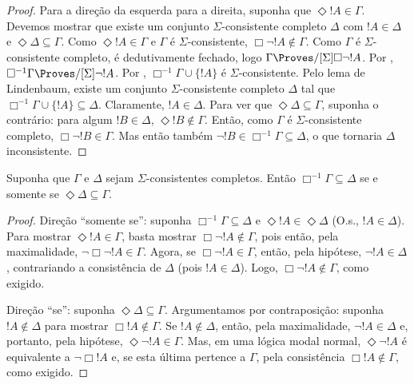 \documentclass[../../../include/open-logic-section]{subfiles}
\begin{document}
{\begin{proof}
  Para a direção da esquerda para a direita, suponha que
  $\Diamond !A \in \Gamma$. Devemos mostrar que existe um conjunto
  $\Sigma$-consistente completo $\Delta$ com $!A \in \Delta$ e
  $\Diamond\Delta \subseteq \Gamma$. Como $\Diamond !A \in \Gamma$ e
  $\Gamma$ é $\Sigma$-consistente, $\Box\lnot !A \notin \Gamma$. Como
  $\Gamma$ é $\Sigma$-consistente completo, é dedutivamente fechado,
  logo $\Gamma \Proves/[\Sigma] \Box\lnot !A$. Por ,
  $\Box^{-1}\Gamma \Proves/[\Sigma] \lnot !A$. Por
  ,
  $\Box^{-1}\Gamma \cup \{ !A \}$ é $\Sigma$-consistente. Pelo lema de
  Lindenbaum, existe um conjunto $\Sigma$-consistente completo
  $\Delta$ tal que $\Box^{-1}\Gamma \cup \{ !A \} \subseteq \Delta$.
  Claramente, $!A \in \Delta$. Para ver que $\Diamond\Delta
  \subseteq \Gamma$, suponha o contrário: para algum $!B \in \Delta$,
  $\Diamond !B \notin \Gamma$. Então, como $\Gamma$ é
  $\Sigma$-consistente completo, $\Box\lnot !B \in \Gamma$. Mas então
  também $\lnot !B \in \Box^{-1}\Gamma \subseteq \Delta$, o que
  tornaria $\Delta$ inconsistente.
\end{proof}
}

\begin{lem}
  Suponha que $\Gamma$ e $\Delta$ sejam $\Sigma$-consistentes
  completos. Então $\Box^{-1}\Gamma \subseteq \Delta$ se e somente se
  $\Diamond\Delta \subseteq \Gamma$.
\end{lem}

\begin{proof}
  Direção ``somente se'': suponha $\Box^{-1}\Gamma \subseteq \Delta$ e
  $\Diamond!A \in \Diamond\Delta$ (O.s.\@, $!A \in \Delta$). Para
  mostrar $\Diamond!A \in \Gamma$, basta mostrar
  $\Box\lnot!A \notin \Gamma$, pois então, pela maximalidade,
  $\lnot\Box\lnot !A \in \Gamma$. Agora, se
  $\Box\lnot!A \in \Gamma$, então, pela hipótese, $\lnot!A \in \Delta$,
  contrariando a consistência de $\Delta$ (pois $!A \in \Delta$).
  Logo, $\Box\lnot!A \notin \Gamma$, como exigido.

  Direção ``se'': suponha $\Diamond\Delta \subseteq \Gamma$.
  Argumentamos por contraposição: suponha $!A \notin \Delta$ para
  mostrar $\Box!A \notin \Gamma$. Se $!A \notin \Delta$, então, pela
  maximalidade, $\lnot!A \in \Delta$ e, portanto, pela hipótese,
  $\Diamond\lnot!A \in \Gamma$. Mas, em uma lógica modal normal,
  $\Diamond\lnot!A$ é equivalente a $\lnot\Box !A$ e, se esta última
  pertence a $\Gamma$, pela consistência $\Box!A \notin\Gamma$, como
  exigido.
\end{proof}
\end{document}

